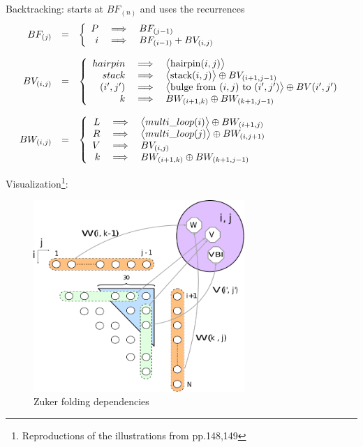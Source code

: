 \item Backtracking: starts at $BF_{(n)}$ and uses the recurrences
 \[\begin{array}{rcl}
	BF_{(j)} &=& \left\{\begin{array}{rcl} P&\implies& BF_{(j-1)} \\ i &\implies& BF_{(i-1)} + BV_{(i,j)} \end{array} \right.\\
	\\
	BV_{(i,j)} &=& \left\{\begin{array}{rcl}
		hairpin &\implies&\big< {\rm hairpin}(i,j) \big> \\
		stack &\implies& \big< {\rm stack}(i,j) \big> \oplus BV_{(i+1,j-1)} \\
		(i',j') &\implies& \big< \text{bulge from $(i,j)$ to }(i',j') \big> \oplus BV(i',j')\\
		k &\implies& BW_{(i+1,k)} \oplus BW_{(k+1,j-1)}
	\end{array}\right.\\
	\\
	BW_{(i,j)} &=& \left\{\begin{array}{rcl}
	L & \implies & \big< multi\_loop(i) \big> \oplus BW_{(i+1,j)} \\
	R & \implies & \big< multi\_loop(j) \big> \oplus BW_{(i,j+1)} \\
	V &\implies& BV_{(i,j)} \\
	k &\implies& BW_{(i+1,k)} \oplus BW_{(k+1,j-1)}
	\end{array}\right.
\end{array}\]

\item Visualization\footnote{Reproductions of the illustrations from \cite{para_dprec} pp.148,149}:
\begin{figure}[H]\begin{center}\includegraphics[width=8cm]{inc/zuker_rec.pdf}\end{center}\caption{Zuker folding dependencies}\end{figure}

